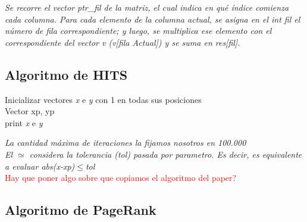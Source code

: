 \documentclass[a4paper]{article}
\begin{document}
\textit{Se recorre el vector ptr_fil de la matriz, el cual indica en qu\'e \'indice comienza cada columna. Para cada elemento de la columna actual, se asigna en el int fil el n\'umero de fila correspondiente; y luego, se multiplica ese elemento con el correspondiente del vector v (v[fila Actual]) y se suma en res[fil].}\\


\newpage
\subsection{Algoritmo de HITS}

\IncMargin{1em}
\begin{algorithm}

\BlankLine

Inicializar vectores \emph{x} e \emph{y} con 1 en todas sus posiciones\\
Vector xp, yp\\
print \emph{x} e \emph{y}
\end{algorithm}\DecMargin{1em}
\textit{La cantidad m\'axima de iteraciones la fijamos nosotros en 100.000 \\
El $\simeq$ considera la tolerancia (tol) pasada por parametro. Es decir, es equivalente a evaluar abs(x-xp)$\leq$tol} \\
\textcolor{red}{Hay que poner algo sobre que copiamos el algoritmo del paper?}
\newpage
\subsection{Algoritmo de PageRank}
\end{document}

